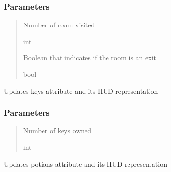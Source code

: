 \documentclass[letterpaper,10pt,english]{sphinxmanual}
\begin{document}
\begin{fulllineitems}
\begin{fulllineitems}
\subsubsection{Parameters}
\label{\detokenize{api_reference/dungeon_gui/hud:id5}}\begin{quote}\begin{description}
\sphinxAtStartPar
Number of room visited

\sphinxAtStartPar
int

\sphinxAtStartPar
Boolean that indicates if the room is an exit

\sphinxAtStartPar
bool

\end{description}\end{quote}

\end{fulllineitems}


\begin{fulllineitems}
\label{\detokenize{api_reference/dungeon_gui/hud:hud.HUD.update_keys}}
\pysigstartsignatures
{}
\pysigstopsignatures
\sphinxAtStartPar
Updates keys attribute and its HUD representation


\subsubsection{Parameters}
\label{\detokenize{api_reference/dungeon_gui/hud:id6}}\begin{quote}\begin{description}
\sphinxAtStartPar
Number of keys owned

\sphinxAtStartPar
int

\end{description}\end{quote}

\end{fulllineitems}


\begin{fulllineitems}
\label{\detokenize{api_reference/dungeon_gui/hud:hud.HUD.update_potions}}
\pysigstartsignatures
{}
\pysigstopsignatures
\sphinxAtStartPar
Updates potions attribute and its HUD representation



\end{fulllineitems}
\end{fulllineitems}
\end{document}
